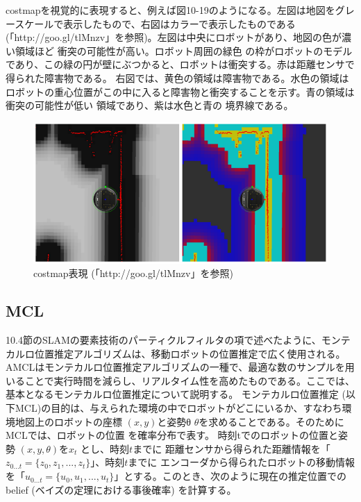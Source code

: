 costmapを視覚的に表現すると、例えば図10-19のようになる。左図は地図をグレースケールで表示したもので、右図はカラーで表示したものである (「http://goo.gl/tlMnzv」を参照)。左図は中央にロボットがあり、地図の色が濃い領域ほど  衝突の可能性が高い。ロボット周囲の緑色  の枠がロボットのモデルであり、この緑の円が壁にぶつかると、ロボットは衝突する。赤は距離センサで得られた障害物である。
右図では、黄色の領域は障害物である。水色の領域はロボットの重心位置がこの中に入ると障害物と衝突することを示す。青の領域は衝突の可能性が低い  領域であり、紫は水色と青の  境界線である。

\begin{figure}[ht]
  \centering
  \includegraphics[width=\columnwidth]{pictures/chapter10/pic_10_19.png}
  \caption{costmap表現 (「http://goo.gl/tlMnzv」を参照)}
\end{figure}

\subsection{MCL}

10.4節のSLAMの要素技術のパーティクルフィルタの項で述べたように、モンテカルロ位置推定アルゴリズムは、移動ロボットの位置推定で広く使用される。AMCLはモンテカルロ位置推定アルゴリズムの一種で、最適な数のサンプルを用いることで実行時間を減らし、リアルタイム性を高めたものである。ここでは、基本となるモンテカルロ位置推定について説明する。
モンテカルロ位置推定 (以下MCL)の目的は、与えられた環境の中でロボットがどこにいるか、すなわち環境地図上のロボットの座標 $(x, y)$と姿勢θ $\theta$を求めることである。そのためにMCLでは、ロボットの位置 を確率分布で表す。
 時刻tでのロボットの位置と姿勢 $(x, y, \theta)$を$x_t$ とし、時刻$t$までに  距離センサから得られた距離情報を「 $z_{0...t} = \{z_0, z_1, ..., z_t\}$」、時刻$t$までに  エンコーダから得られたロボットの移動情報を「$u_{0...t} = \{u_0, u_1, ..., u_t\}$」とする。このとき、次のように現在の推定位置でのbelief (ベイズの定理における事後確率)  を計算する。

